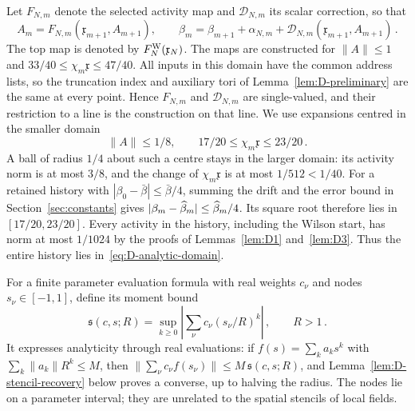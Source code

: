 Let $F_{N,m}$ denote the selected activity map and $\mathcal D_{N,m}$ its scalar correction, so that
\begin{equation*}
A_m=F_{N,m}(\mathfrak x_{m+1},A_{m+1}),\qquad
\beta_m=\beta_{m+1}+\alpha_{N,m}+\mathcal D_{N,m}(\mathfrak x_{m+1},A_{m+1})\,.
\end{equation*}
The top map is denoted by $F_N^{\rm W}(\mathfrak x_N)$. The maps are constructed for $\|A\|\le1$ and $33/40\le\chi_m\mathfrak x\le47/40$. All inputs in this domain have the common address lists, so the truncation index and auxiliary tori of Lemma~\ref{lem:D-preliminary} are the same at every point. Hence $F_{N,m}$ and $\mathcal D_{N,m}$ are single-valued, and their restriction to a line is the construction on that line. We use expansions centred in the smaller domain
\begin{equation}\label{eq:D-analytic-domain}
\|A\|\le1/8,\qquad 17/20\le\chi_m\mathfrak x\le23/20\,.
\end{equation}
A ball of radius $1/4$ about such a centre stays in the larger domain: its activity norm is at most $3/8$, and the change of $\chi_m\mathfrak x$ is at most $1/512<1/40$. For a retained history with $|\beta_0-\bar\beta|\le\bar\beta/4$, summing the drift and the error bound in Section~\ref{sec:constants} gives $|\beta_m-\widehat{\beta}_m|\le\widehat{\beta}_m/4$. Its square root therefore lies in $[17/20,23/20]$. Every activity in the history, including the Wilson start, has norm at most $1/1024$ by the proofs of Lemmas~\ref{lem:D1} and~\ref{lem:D3}. Thus the entire history lies in~\eqref{eq:D-analytic-domain}.

For a finite parameter evaluation formula with real weights $c_\nu$ and nodes $s_\nu\in[-1,1]$, define its moment bound
\begin{equation}\label{eq:D-real-stencil}
\mathfrak s(c,s;R)=\sup_{k\ge0}\left|\sum_\nu c_\nu(s_\nu/R)^k\right|\,,\qquad R>1\,.
\end{equation}
It expresses analyticity through real evaluations: if $f(s)=\sum_ka_ks^k$ with $\sum_k\|a_k\|R^k\le M$, then $\|\sum_\nu c_\nu f(s_\nu)\|\le M\,\mathfrak s(c,s;R)$, and Lemma~\ref{lem:D-stencil-recovery} below proves a converse, up to halving the radius. The nodes lie on a parameter interval; they are unrelated to the spatial stencils of local fields.

